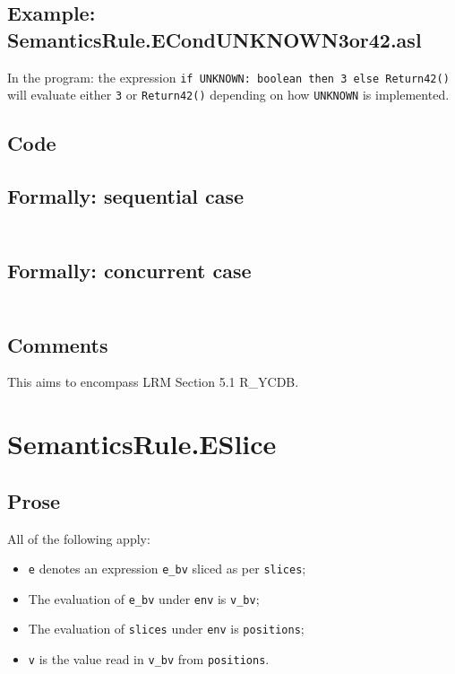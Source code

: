\documentclass{book}
\begin{document}
  \subsection{Example: SemanticsRule.ECondUNKNOWN3or42.asl}
    In the program:
the expression \texttt{if UNKNOWN: boolean then 3 else Return42()} will
evaluate either \texttt{3} or \texttt{Return42()} depending on how
\texttt{UNKNOWN} is implemented.

  \subsection{Code}

  \subsection{Formally: sequential case}
  \begin{align}
  \end{align} 

  \subsection{Formally: concurrent case}
  \begin{align}
  \end{align} 

  \subsection{Comments}
  This aims to encompass LRM Section 5.1 R\_YCDB.

\section{SemanticsRule.ESlice \label{sec:SemanticsRule.ESlice}}

  \subsection{Prose}
  All of the following apply:
  \begin{itemize}
  \item \texttt{e} denotes an expression \texttt{e\_bv} sliced as per \texttt{slices};
  \item The evaluation of \texttt{e\_bv} under \texttt{env} is \texttt{v\_bv};
  \item The evaluation of \texttt{slices} under \texttt{env} is \texttt{positions};
  \item \texttt{v} is the value read in \texttt{v\_bv} from \texttt{positions}.
  \end{itemize}
\end{document}
